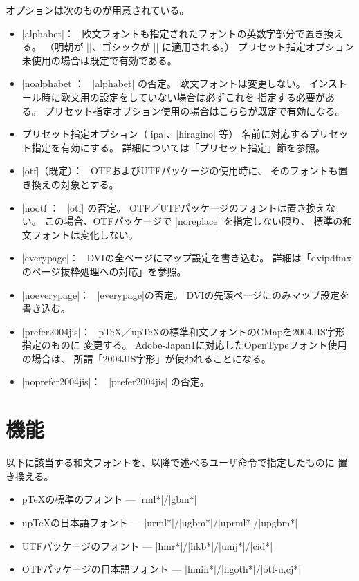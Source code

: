 \documentclass[a4paper,uplatex]{jsarticle}
\newcommand{\Pkg}[1]{\textsf{#1}}
\newcommand{\Means}{：\ }
\providecommand{\pTeX}{p\TeX}
\providecommand{\upTeX}{u\pTeX}
\begin{document}
オプションは次のものが用意されている。

\begin{itemize}
\item |alphabet|\Means
  欧文フォントも指定されたフォントの英数字部分で置き換える。
  （明朝が |\rmfamily|、ゴシックが |\sffamily| に適用される。）
  プリセット指定オプション未使用の場合は既定で有効である。
\item |noalphabet|\Means
  |alphabet| の否定。
  欧文フォントは変更しない。
  インストール時に欧文用の設定をしていない場合は必ずこれを
  指定する必要がある。
  プリセット指定オプション使用の場合はこちらが既定で有効になる。
\item プリセット指定オプション（|ipa|、|hiragino| 等）
  名前に対応するプリセット指定を有効にする。
  詳細については「プリセット指定」節を参照。
\item |otf|（既定）\Means
  \Pkg{OTF}および\Pkg{UTF}パッケージの使用時に、
  そのフォントも置き換えの対象とする。
\item |nootf|\Means
  |otf| の否定。
  \Pkg{OTF}／\Pkg{UTF}パッケージのフォントは置き換えない。
  この場合、\Pkg{OTF}パッケージで |noreplace| を指定しない限り、
  標準の和文フォントは変化しない。
\item |everypage|\Means
  DVIの全ページにマップ設定を書き込む。
  詳細は「dvipdfmx のページ抜粋処理への対応」を参照。
\item |noeverypage|\Means
  |everypage|の否定。
  DVIの先頭ページにのみマップ設定を書き込む。
\item |prefer2004jis|\Means
  {\pTeX}／{\upTeX}の標準和文フォントのCMapを2004JIS字形指定のものに
  変更する。
  Adobe-Japan1に対応したOpenTypeフォント使用の場合は、
  所謂「2004JIS字形」が使われることになる。
\item |noprefer2004jis|\Means
  |prefer2004jis| の否定。
\end{itemize}

\section{機能}

以下に該当する和文フォントを、以降で述べるユーザ命令で指定したものに
置き換える。
\begin{itemize}
\item {\pTeX}の標準のフォント --- |rml*|/|gbm*|
\item {\upTeX}の日本語フォント --- |urml*|/|ugbm*|/|uprml*|/|upgbm*|
\item \Pkg{UTF}パッケージのフォント --- |hmr*|/|hkb*|/|unij*|/|cid*|
\item \Pkg{OTF}パッケージの日本語フォント --- |hmin*|/|hgoth*|/|otf-{u,c}j*|
\end{itemize}
\end{document}
